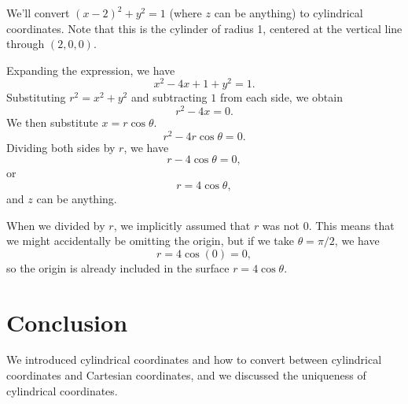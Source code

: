 \documentclass{ximera}
\begin{document}
\begin{example}
We'll convert $(x-2)^2 + y^2 = 1$ (where $z$ can be anything) to cylindrical coordinates. Note that this is the cylinder of radius 1, centered at the vertical line through $(2,0,0)$.

Expanding the expression, we have
\[
x^2-4x+1+y^2 =1.
\]
Substituting $r^2 = x^2+y^2$ and subtracting $1$ from each side, we obtain
\[
r^2-4x=0.
\]
We then substitute $x = r\cos\theta$.
\[
r^2-4r\cos\theta = 0.
\]
Dividing both sides by $r$, we have
\[
r-4\cos\theta = 0,
\]
or
\[
r = 4\cos\theta,
\]
and $z$ can be anything.

When we divided by $r$, we implicitly assumed that $r$ was not $0$. This means that we might accidentally be omitting the origin, but if we take $\theta = \pi/2$, we have
\[
r = 4\cos(0) = 0,
\]
so the origin is already included in the surface $r = 4\cos\theta$.

\begin{image}
\end{image}

\end{example}

\section{Conclusion}

We introduced cylindrical coordinates and how to convert between cylindrical coordinates and Cartesian coordinates, and we discussed the uniqueness of cylindrical coordinates.
\end{document}
